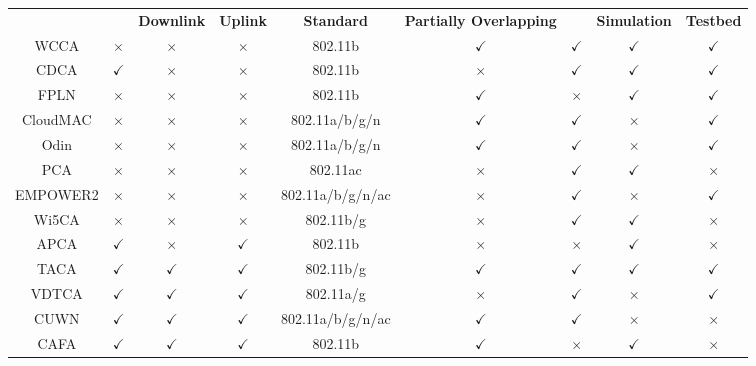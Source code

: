 \begin{table*}
\begin{tabular}{|c|c|c|c|c|c|c|c|c|}
		&& \textbf{Downlink}& \textbf{Uplink}& \textbf{Standard} & \textbf{Partially Overlapping} & & \textbf{Simulation} & \textbf{Testbed}\\ \Xhline{3\arrayrulewidth}
		WCCA \cite{Wcolor-2005} &$\times$&$\times$&$\times$&802.11b&$\checkmark$&$\checkmark$&$\checkmark$&$\checkmark$\\\hline
	    CDCA \cite{J-DCA-LB-2006}&$\checkmark$&$\times$&$\times$&802.11b&$\times$&$\checkmark$&$\checkmark$&$\checkmark$\\\hline
		FPLN \cite{CAPWAP-based-CA-11}&$\times$&$\times$&$\times$&802.11b&$\checkmark$&$\times$&$\checkmark$&$\checkmark$\\\hline					
		CloudMAC \cite{CloudMAC}&$\times$&$\times$&$\times$&802.11a/b/g/n&$\checkmark$&$\checkmark$&$\times$&$\checkmark$\\\hline		
		Odin \cite{Odin2}&$\times$&$\times$&$\times$&802.11a/b/g/n&$\checkmark$&$\checkmark$&$\times$&$\checkmark$\\\hline				
		PCA \cite{802.11ac-PCA}&$\times$&$\times$&$\times$&802.11ac&$\times$&$\checkmark$&$\checkmark$&$\times$\\\hline		
		EMPOWER2 \cite{Primitives}&$\times$&$\times$&$\times$&802.11a/b/g/n/ac&$\times$&$\checkmark$&$\times$&$\checkmark$\\\hline		
		Wi5CA \cite{DCA-2}&$\times$&$\times$&$\times$&802.11b/g&$\times$&$\checkmark$&$\checkmark$&$\times$		 \\\hline
		APCA \cite{J-AP-DCA-2006}&$\checkmark$&$\times$&$\checkmark$&802.11b&$\times$&$\times$&$\checkmark$&$\times$\\\hline		
		TACA \cite{Traffic-aware-CA-2007}&$\checkmark$&$\checkmark$&$\checkmark$&802.11b/g&$\checkmark$&$\checkmark$&$\checkmark$&$\checkmark$\\\hline
		VDTCA \cite{Measurement-CA-WCNC-10}&$\checkmark$&$\checkmark$&$\checkmark$&802.11a/g&$\times$&$\checkmark$&$\times$&$\checkmark$\\\hline					
		CUWN \cite{Cisco}&$\checkmark$&$\checkmark$&$\checkmark$&802.11a/b/g/n/ac&$\checkmark$&$\checkmark$&$\times$&$\times$\\\hline					
		CAFA \cite{CA-F-WCNC-11}&$\checkmark$&$\checkmark$&$\checkmark$&802.11b&$\checkmark$&$\times$&$\checkmark$&$\times$ \\\hline

\end{tabular}
\end{table*}
